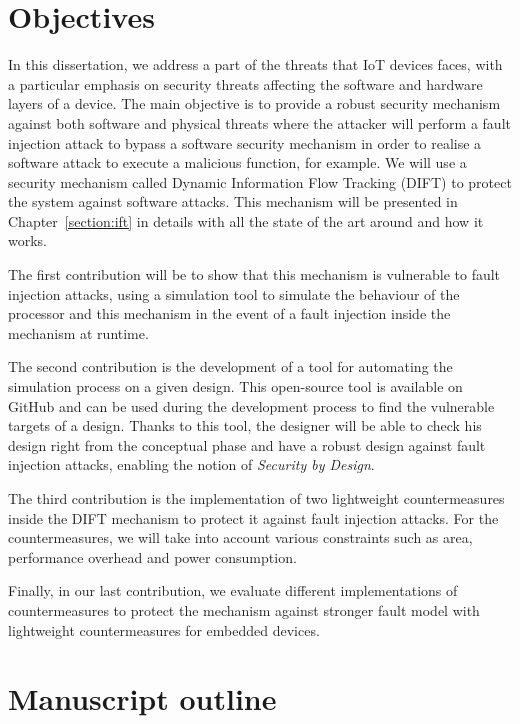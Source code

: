 \section{Objectives}

In this dissertation, we address a part of the threats that IoT devices faces, with a particular emphasis on security threats affecting the software and hardware layers of a device. The main objective is to provide a robust security mechanism against both software and physical threats where the attacker will perform a fault injection attack to bypass a software security mechanism in order to realise a software attack to execute a malicious function, for example.
We will use a security mechanism called Dynamic Information Flow Tracking (DIFT) to protect the system against software attacks. This mechanism will be presented in Chapter~\ref{section:ift} in details with all the state of the art around and how it works.

The first contribution will be to show that this mechanism is vulnerable to fault injection attacks, using a simulation tool to simulate the behaviour of the processor and this mechanism in the event of a fault injection inside the mechanism at runtime.

The second contribution is the development of a tool for automating the simulation process on a given design. This open-source tool is available on GitHub and can be used during the development process to find the vulnerable targets of a design. Thanks to this tool, the designer will be able to check his design right from the conceptual phase and have a robust design against fault injection attacks, enabling the notion of \textit{Security by Design}.

The third contribution is the implementation of two lightweight countermeasures inside the DIFT mechanism to protect it against fault injection attacks. For the countermeasures, we will take into account various constraints such as area, performance overhead and power consumption.

Finally, in our last contribution, we evaluate different implementations of countermeasures to protect the mechanism against stronger fault model with lightweight countermeasures for embedded devices.


\section{Manuscript outline}

